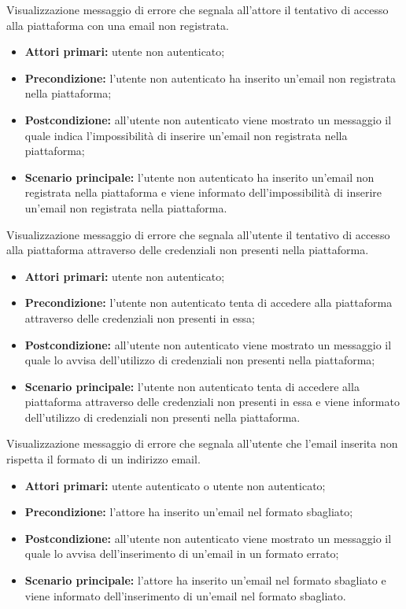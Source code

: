 Visualizzazione messaggio di errore che segnala all'attore il tentativo di accesso alla piattaforma con una email non registrata.
\begin{itemize}
    \item \textbf{Attori primari:} utente non autenticato;
    \item \textbf{Precondizione:} l'utente non autenticato ha inserito un'email non registrata nella piattaforma;
    \item \textbf{Postcondizione:} all'utente non autenticato viene mostrato un messaggio il quale indica l'impossibilità di inserire un'email non registrata nella piattaforma;
    \item \textbf{Scenario principale:} l'utente non autenticato ha inserito un'email non registrata nella piattaforma e viene informato dell'impossibilità di inserire un'email non registrata nella piattaforma.
\end{itemize}

Visualizzazione messaggio di errore che segnala all'utente il tentativo di accesso alla piattaforma attraverso delle credenziali non presenti nella piattaforma.
\begin{itemize}
    \item \textbf{Attori primari:} utente non autenticato;
    \item \textbf{Precondizione:} l'utente non autenticato tenta di accedere alla piattaforma attraverso delle credenziali non presenti in essa;
    \item \textbf{Postcondizione:} all'utente non autenticato viene mostrato un messaggio il quale lo avvisa dell'utilizzo di credenziali non presenti nella piattaforma;
    \item \textbf{Scenario principale:} l'utente non autenticato tenta di accedere alla piattaforma attraverso delle credenziali non presenti in essa e viene informato dell'utilizzo di credenziali non presenti nella piattaforma.
\end{itemize}

Visualizzazione messaggio di errore che segnala all'utente che l'email inserita non rispetta il formato di un indirizzo email.
\begin{itemize}
    \item \textbf{Attori primari:} utente autenticato o utente non autenticato;
    \item \textbf{Precondizione:} l'attore ha inserito un'email nel formato sbagliato;
    \item \textbf{Postcondizione:} all'utente non autenticato viene mostrato un messaggio il quale lo avvisa dell'inserimento di un'email in un formato errato;
    \item \textbf{Scenario principale:} l'attore ha inserito un'email nel formato sbagliato e viene informato dell'inserimento di un'email nel formato sbagliato.
\end{itemize}

